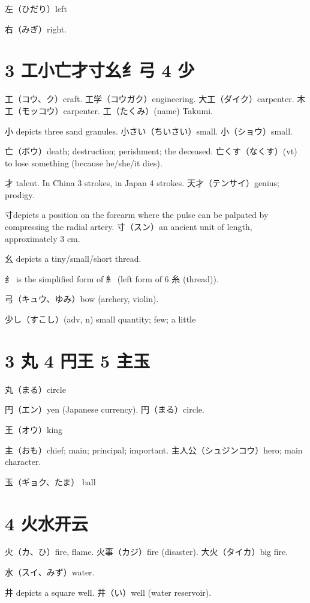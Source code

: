 左（ひだり）left

右（みぎ）right.

\section{3 工小亡才寸幺纟弓 4 少}

工（コウ、ク）craft.
工学（コウガク）engineering.
大工（ダイク）carpenter.
木工（モッコウ）carpenter.
工（たくみ）(name) Takumi.

小 depicts three sand granules.
小さい（ちいさい）small.
小（ショウ）small.

亡（ボウ）death; destruction; perishment; the deceased.
亡くす（なくす）(vt) to lose something (because he/she/it dies).

才 talent.
In China 3 strokes, in Japan 4 strokes.
天才（テンサイ）genius; prodigy.

寸depicts a position on the forearm
where the pulse can be palpated by compressing the radial artery.
寸（スン）an ancient unit of length, approximately 3 cm.

幺 depicts a tiny/small/short thread.

纟 is the simplified form of 糹
(left form of 6 糸 (thread)).

弓（キュウ、ゆみ）bow (archery, violin).

少し（すこし）(adv, n) small quantity; few; a little

\section{3 丸 4 円王 5 主玉}

丸（まる）circle

円（エン）yen (Japanese currency).
円（まる）circle.

王（オウ）king

主（おも）chief; main; principal; important.
主人公（シュジンコウ）hero; main character.

玉（ギョク、たま） ball

\section{4 火水开云}

火（カ、ひ）fire, flame.
火事（カジ）fire (disaster).
大火（タイカ）big fire.

水（スイ、みず）water.

井 depicts a square well.
井（い）well (water reservoir).

